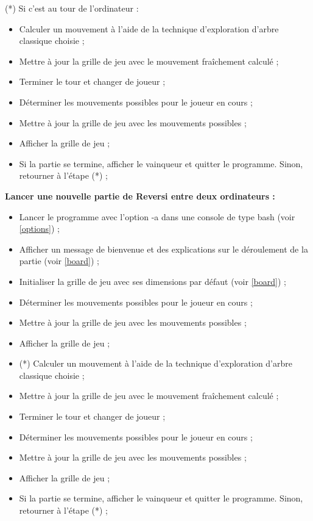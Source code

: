 \documentclass[10pt,a4paper]{article}
\begin{document}
(*) Si c'est au tour de l'ordinateur :
\begin{itemize}
\item Calculer un mouvement à l'aide de la technique d'exploration d'arbre classique choisie ;
\item Mettre à jour la grille de jeu avec le mouvement fraîchement calculé ;
\item Terminer le tour et changer de joueur ;
\item Déterminer les mouvements possibles pour le joueur en cours ;
\item Mettre à jour la grille de jeu avec les mouvements possibles ;
\item Afficher la grille de jeu ;
\item Si la partie se termine, afficher le vainqueur et quitter le programme.
Sinon, retourner à l'étape (*) ;\\
\end{itemize}
\newpage

\textbf{Lancer une nouvelle partie de Reversi entre deux ordinateurs :}\\
\begin{itemize}
\item Lancer le programme avec l'option -a dans une console de type bash (voir \ref{options}) ;
\item Afficher un message de bienvenue et des explications sur le déroulement de la partie (voir \ref{board}) ;\\
\item Initialiser la grille de jeu avec ses dimensions par défaut (voir \ref{board}) ;
\item Déterminer les mouvements possibles pour le joueur en cours ;
\item Mettre à jour la grille de jeu avec les mouvements possibles ;
\item Afficher la grille de jeu ;\\
\item (*) Calculer un mouvement à l'aide de la technique d'exploration d'arbre classique choisie ;
\item Mettre à jour la grille de jeu avec le mouvement fraîchement calculé ;
\item Terminer le tour et changer de joueur ;
\item Déterminer les mouvements possibles pour le joueur en cours ;
\item Mettre à jour la grille de jeu avec les mouvements possibles ;
\item Afficher la grille de jeu ;
\item Si la partie se termine, afficher le vainqueur et quitter le programme.
Sinon, retourner à l'étape (*) ;\\
\end{itemize}
\end{document}
